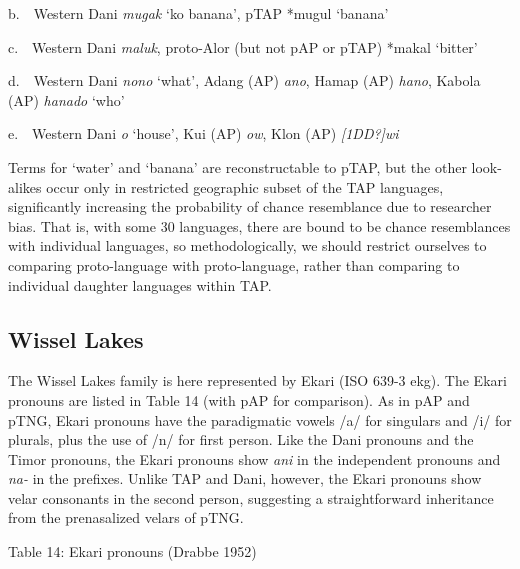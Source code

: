 b.\ \ Western Dani \textit{mugak} {\textquoteleft}ko banana{\textquoteright}, pTAP *mugul {\textquoteleft}banana{\textquoteright}

c.\ \ Western Dani \textit{maluk}, proto-Alor (but not pAP or pTAP) *makal {\textquoteleft}bitter{\textquoteright}

d.\ \ Western Dani \textit{nono} {\textquoteleft}what{\textquoteright},  Adang (AP) \textit{ano}, Hamap (AP) \textit{hano}, Kabola (AP) \textit{hanado} {\textquoteleft}who{\textquoteright}

e.\ \ Western Dani \textit{o} {\textquoteleft}house{\textquoteright}, Kui (AP) \textit{ow}, Klon (AP) \textit{[1DD?]}\textit{wi}

Terms for {\textquoteleft}water{\textquoteright} and {\textquoteleft}banana{\textquoteright} are reconstructable to pTAP, but the other look-alikes occur only in restricted geographic subset of the TAP languages, significantly increasing the probability of chance resemblance due to researcher bias. That is, with some 30 languages, there are bound to be chance resemblances with individual languages, so methodologically, we should restrict ourselves to comparing proto-language with proto-language, rather than comparing to individual daughter languages within TAP.

\subsection[Wissel Lakes]{Wissel Lakes}
\hypertarget{RefHeading72086871885726}{}The Wissel Lakes family is here represented by Ekari (ISO 639-3 ekg). The Ekari pronouns are listed in Table 14 (with pAP for comparison). As in pAP and pTNG, Ekari pronouns have the paradigmatic vowels /a/ for singulars and /i/ for plurals, plus the use of /n/ for first person. Like the Dani pronouns and the Timor pronouns, the Ekari pronouns show \textit{ani} in the independent pronouns and \textit{na-} in the prefixes. Unlike TAP and Dani, however, the Ekari pronouns show velar consonants in the second person, suggesting a straightforward inheritance from the prenasalized velars of pTNG.

{\centering
Table 14: Ekari pronouns (Drabbe 1952) 
\par}

